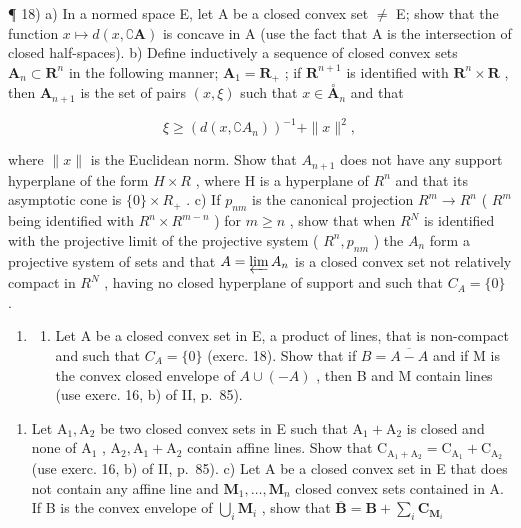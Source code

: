   ¶ 18) a) In a normed space E, let A be a closed convex set \(\neq\) E; show that the function \(x\mapsto d(x,\complement\mathbf{A})\) is concave in A (use the fact that A is the intersection of closed half-spaces). b) Define inductively a sequence of closed convex sets \(\mathbf{A}_{n}\subset\mathbf{R}^{n}\) in the following manner; \(\mathbf{A}_{1}=\mathbf{R}_{+}\) ; if \(\mathbf{R}^{n+1}\) is identified with \(\mathbf{R}^{n}\times\mathbf{R}\) , then \(\mathbf{A}_{n+1}\) is the set of pairs \((x,\xi)\) such that \(x\in\overset{\circ}{\mathbf{A}}_{n}\) and that

\[
\xi \geqslant (d (x, \complement A _ {n})) ^ {- 1} + \| x \| ^ {2},
\]

where \(\|x\|\) is the Euclidean norm. Show that \(A_{n+1}\) does not have any support hyperplane of the form \(H \times R\) , where H is a hyperplane of \(R^{n}\) and that its asymptotic cone is \(\{0\} \times R_{+}\) . c) If \(p_{nm}\) is the canonical projection \(R^{m} \to R^{n}\) ( \(R^{m}\) being identified with \(R^{n} \times R^{m-n}\) ) for \(m \geqslant n\) , show that when \(R^{N}\) is identified with the projective limit of the projective system ( \(R^{n}, p_{nm}\) ) the \(A_{n}\) form a projective system of sets and that \(A = \varprojlim A_{n}\) is a closed convex set not relatively compact in \(R^{N}\) , having no closed hyperplane of support and such that \(C_{A} = \{0\}\) .

\begin{enumerate}
\def\labelenumi{\arabic{enumi})}
\setcounter{enumi}{18}
\tightlist
\item
  \begin{enumerate}
  \def\labelenumii{\alph{enumii})}
  \tightlist
  \item
    Let A be a closed convex set in E, a product of lines, that is non-compact and such that \(C_{A} = \{0\}\) (exerc. 18). Show that if \(B = \overline{A - A}\) and if M is the convex closed envelope of \(A \cup (-A)\) , then B and M contain lines (use exerc. 16, b) of II, p.~85).
  \end{enumerate}
\end{enumerate}

\begin{enumerate}
\def\labelenumi{\alph{enumi})}
\setcounter{enumi}{1}
\tightlist
\item
  Let \(\mathrm{A}_1, \mathrm{A}_2\) be two closed convex sets in E such that \(\mathrm{A}_1 + \mathrm{A}_2\) is closed and none of \(\mathrm{A}_1\) , \(\mathrm{A}_2, \mathrm{A}_1 + \mathrm{A}_2\) contain affine lines. Show that \(\mathrm{C}_{\mathrm{A}_1 + \mathrm{A}_2} = \mathrm{C}_{\mathrm{A}_1} + \mathrm{C}_{\mathrm{A}_2}\) (use exerc. 16, b) of II, p.~85). c) Let A be a closed convex set in E that does not contain any affine line and \(\mathbf{M}_1, \dots, \mathbf{M}_n\) closed convex sets contained in A. If B is the convex envelope of \(\bigcup_{i} \mathbf{M}_i\) , show that \(\overline{\mathbf{B}} = \mathbf{B} + \sum_{i} \mathbf{C}_{\mathbf{M}_i}\)
\end{enumerate}

